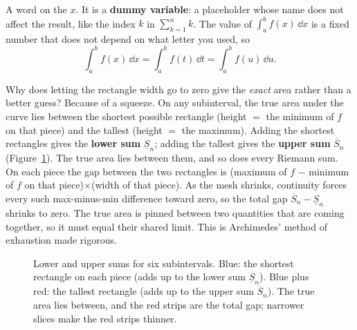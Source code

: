 A word on the $x$. It is a \textbf{dummy variable}: a placeholder whose name does
not affect the result, like the index $k$ in $\sum_{k=1}^n k$. The value of
$\int_a^b f(x)\,\dd x$ is a fixed number that does not depend on what letter you
used, so
\[
  \int_a^b f(x)\,\dd x = \int_a^b f(t)\,\dd t = \int_a^b f(u)\,\dd u.
\]

\begin{whybox}
Why does letting the rectangle width go to zero give the \emph{exact} area
rather than a better guess? Because of a squeeze. On any subinterval, the
true area under the curve lies between the shortest possible rectangle (height
$=$ the minimum of $f$ on that piece) and the tallest (height $=$ the maximum).
Adding the shortest rectangles gives the \textbf{lower sum} $\underline{S}_n$;
adding the tallest gives the \textbf{upper sum} $\overline{S}_n$
(Figure~\ref{ch20:fig-upper-lower}). The true area lies between them, and so
does every Riemann sum. On each piece the gap between the two rectangles is
(maximum of $f$ $-$ minimum of $f$ on that piece)$\times$(width of that piece).
As the mesh shrinks, continuity forces every such max-minus-min difference
toward zero, so the total gap $\overline{S}_n - \underline{S}_n$ shrinks to
zero. The true area is pinned between two quantities that are coming together,
so it must equal their shared limit. This is Archimedes' method of
exhaustion made rigorous.
\end{whybox}

\begin{figure}[htbp]
\centering
{}
\caption{Lower and upper sums for six subintervals. Blue: the shortest rectangle
on each piece (adds up to the lower sum $\underline{S}_n$). Blue plus red: the
tallest rectangle (adds up to the upper sum $\overline{S}_n$). The true area lies
between, and the red strips are the total gap; narrower slices make the red
strips thinner.}
\label{ch20:fig-upper-lower}
\end{figure}


